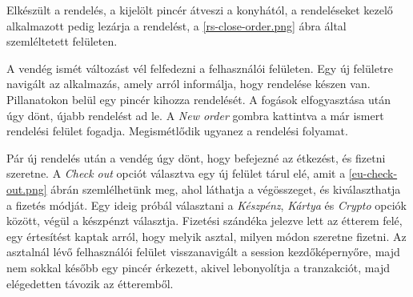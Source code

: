 Elkészült a rendelés, a kijelölt pincér átveszi a konyhától, a rendeléseket kezelő alkalmazott pedig lezárja a rendelést, a \ref{rs-close-order.png} ábra által szemléltetett felületen.

A vendég ismét változást vél felfedezni a felhasználói felületen. Egy új felületre navigált az alkalmazás, amely arról informálja, hogy rendelése készen van. Pillanatokon belül egy pincér kihozza rendelését. A fogások elfogyasztása után úgy dönt, újabb rendelést ad le. A \emph{New order} gombra kattintva a már ismert rendelési felület fogadja. Megismétlődik ugyanez a rendelési folyamat. \par


Pár új rendelés után a vendég úgy dönt, hogy befejezné az étkezést, és fizetni szeretne. A \emph{Check out} opciót választva egy új felület tárul elé, amit a \ref{eu-check-out.png} ábrán szemlélhetünk meg, ahol láthatja a végösszeget, és kiválaszthatja a fizetés módját. Egy ideig próbál választani a \emph{Készpénz}, \emph{Kártya} és \emph{Crypto} opciók között, végül a készpénzt választja. Fizetési szándéka jelezve lett az étterem felé, egy értesítést kaptak arról, hogy melyik asztal, milyen módon szeretne fizetni. Az asztalnál lévő felhasználói felület visszanavigált a session kezdőképernyőre, majd nem sokkal később egy pincér érkezett, akivel lebonyolítja a tranzakciót, majd elégedetten távozik az étteremből.

